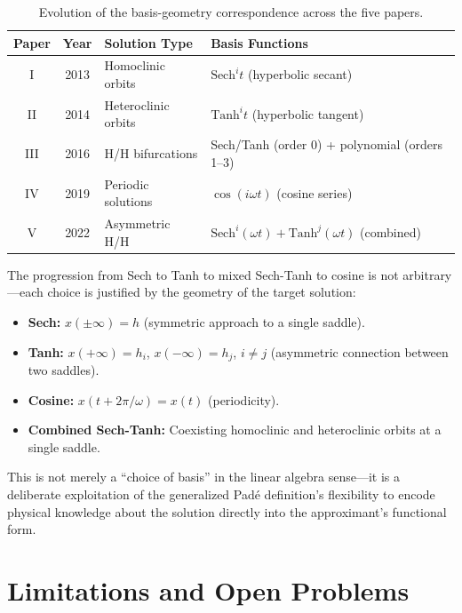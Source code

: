 \documentclass[11pt,a4paper]{article}
\begin{document}
\begin{table}[htbp]
\centering
\caption{Evolution of the basis-geometry correspondence across the five papers.}
\label{tab:evolution}
\begin{tabular}{ccll}
\toprule
\textbf{Paper} & \textbf{Year} & \textbf{Solution Type} & \textbf{Basis Functions} \\
\midrule
I & 2013 & Homoclinic orbits & $\text{Sech}^i t$ (hyperbolic secant) \\
II & 2014 & Heteroclinic orbits & $\text{Tanh}^i t$ (hyperbolic tangent) \\
III & 2016 & H/H bifurcations & Sech/Tanh (order 0) + polynomial (orders 1--3) \\
IV & 2019 & Periodic solutions & $\cos(i\omega t)$ (cosine series) \\
V & 2022 & Asymmetric H/H & $\text{Sech}^i(\omega t) + \text{Tanh}^j(\omega t)$ (combined) \\
\bottomrule
\end{tabular}
\end{table}

The progression from Sech to Tanh to mixed Sech-Tanh to cosine is not arbitrary---each choice is justified by the geometry of the target solution:

\begin{itemize}[leftmargin=2em]
\item \textbf{Sech:} $x(\pm\infty) = h$ (symmetric approach to a single saddle).
\item \textbf{Tanh:} $x(+\infty) = h_i$, $x(-\infty) = h_j$, $i \neq j$ (asymmetric connection between two saddles).
\item \textbf{Cosine:} $x(t + 2\pi/\omega) = x(t)$ (periodicity).
\item \textbf{Combined Sech-Tanh:} Coexisting homoclinic and heteroclinic orbits at a single saddle.
\end{itemize}

This is not merely a ``choice of basis'' in the linear algebra sense---it is a deliberate exploitation of the generalized Pad\'e definition's flexibility to encode physical knowledge about the solution directly into the approximant's functional form.

\section{Limitations and Open Problems}
\end{document}
